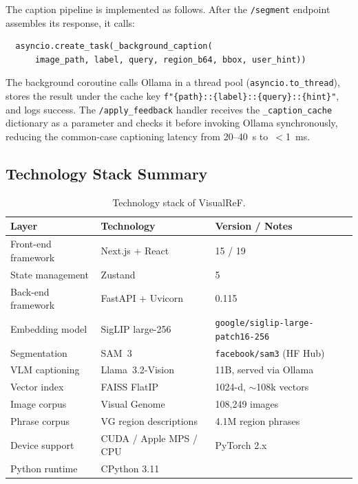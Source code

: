 \documentclass[12pt,a4paper]{article}
\begin{document}
The caption pipeline is implemented as follows. After the \texttt{/segment}
endpoint assembles its response, it calls:
\begin{verbatim}
  asyncio.create_task(_background_caption(
      image_path, label, query, region_b64, bbox, user_hint))
\end{verbatim}
The background coroutine calls Ollama in a thread pool
(\texttt{asyncio.to\_thread}), stores the result under the cache key
\texttt{f"\{path\}::\{label\}::\{query\}::\{hint\}"}, and logs success.
The \texttt{/apply\_feedback} handler receives the \texttt{\_caption\_cache}
dictionary as a parameter and checks it before invoking Ollama synchronously,
reducing the common-case captioning latency from 20--40~s to~$<$1~ms.

\subsection{Technology Stack Summary}

\begin{table}[h]
\centering
\caption{Technology stack of VisualReF.}
\label{tab:stack}
\begin{tabular}{@{}lll@{}}
\toprule
\textbf{Layer} & \textbf{Technology} & \textbf{Version / Notes} \\
\midrule
Front-end framework & Next.js + React    & 15 / 19 \\
State management    & Zustand            & 5 \\
Back-end framework  & FastAPI + Uvicorn  & 0.115 \\
Embedding model     & SigLIP large-256   & \texttt{google/siglip-large-patch16-256} \\
Segmentation        & SAM~3              & \texttt{facebook/sam3} (HF Hub) \\
VLM captioning      & Llama~3.2-Vision   & 11B, served via Ollama \\
Vector index        & FAISS FlatIP       & 1024-d, $\sim$108k vectors \\
Image corpus        & Visual Genome      & 108,249 images \\
Phrase corpus       & VG region descriptions & 4.1M region phrases \\
Device support      & CUDA / Apple MPS / CPU & PyTorch 2.x \\
Python runtime      & CPython 3.11       & \\
\bottomrule
\end{tabular}
\end{table}
\end{document}
